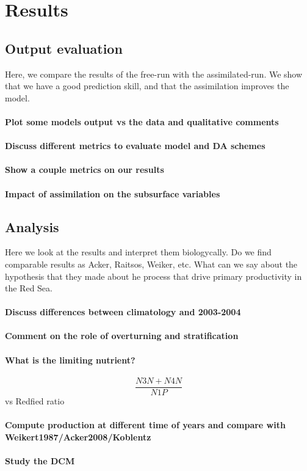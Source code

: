 \section{Results}

\subsection{Output evaluation}

Here, we compare the results of the free-run with the assimilated-run.
We show that we have a good prediction skill, and that the assimilation
improves the model.

\paragraph{Plot some models output vs the data and qualitative comments}

\paragraph{Discuss different metrics to evaluate model and DA schemes}

\paragraph{Show a couple metrics on our results}

\paragraph{Impact of assimilation on the subsurface variables}

\subsection{Analysis}

Here we look at the results and interpret them biologycally. Do we find
comparable results as Acker, Raitsos, Weiker, etc. What can we say about the
hypothesis that they made about he process that drive primary productivity in
the Red Sea.

\paragraph{Discuss differences between climatology and 2003-2004}

\paragraph{Comment on the role of overturning and stratification}

\paragraph{What is the limiting nutrient?}

$$\frac{N3N + N4N}{N1P}$$
vs Redfied ratio

\paragraph{Compute production at different time of years and compare
with Weikert1987/Acker2008/Koblentz}

\paragraph{Study the DCM}
